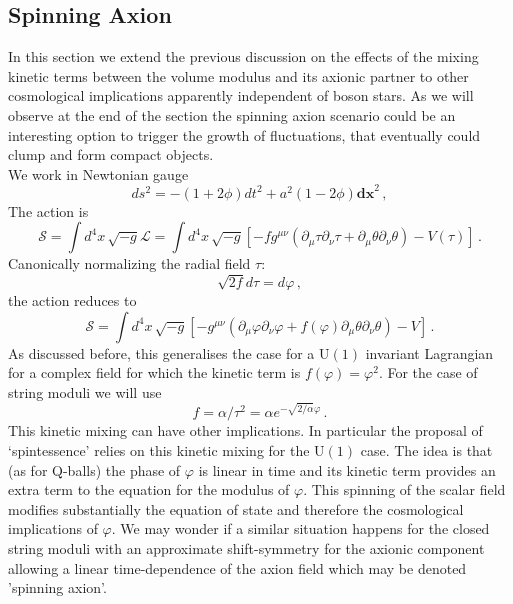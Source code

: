\documentclass[11pt,a4paper]{article}
\begin{document}
\subsection{Spinning Axion}
\label{sec:SpinningAxion}

In this section we extend the previous discussion on the effects of the mixing kinetic terms between the volume modulus and its axionic partner to other cosmological implications apparently independent of boson stars. As we will observe at the end of the section the spinning axion scenario could be an interesting option to trigger the growth of fluctuations, that eventually could clump and form compact objects.\\

We work in Newtonian gauge
\begin{equation}
ds^2 = - \left(1+2 \phi\right)  dt^2 + a^2 \left(1-2\phi\right) \mathbf{dx}^2 \,,
\end{equation}
The action is
\begin{equation}
\label{eq:ActionSpintessence}
\mathcal{S} = \int d^4x \, \sqrt{-g} \mathcal{L} = \int d^4x \, \sqrt{-g} \left[-f g^{\mu \nu} \left(\partial_\mu \tau \partial_\nu \tau + \partial_\mu \theta \partial_\nu \theta\right) - V(\tau)\right] \,.
\end{equation}
Canonically normalizing the radial field $\tau$:
\begin{equation}
\sqrt{2 f} d \tau = d \varphi \,,
\end{equation}
the action reduces to
\begin{equation}
\mathcal{S} = \int d^4x \, \sqrt{-g} \left[-g^{\mu \nu} \left(\partial_\mu \varphi \partial_\nu \varphi + f(\varphi) \partial_\mu \theta \partial_\nu \theta\right) - V\right] \,.
\end{equation}
As discussed before, this generalises the case for a U$(1)$ invariant Lagrangian for a complex field for which the kinetic term is $f(\varphi)=\varphi^2$. For the case of string moduli we will use
\begin{equation}
\label{eq:FModuli}
f=\alpha/\tau^2=\alpha e^{-\sqrt{2/\alpha}\varphi} \,.
\end{equation}
This kinetic mixing can have other implications. In particular the proposal of `spintessence' \cite{Boyle:2001du} relies on this kinetic mixing for the U$(1)$ case. The idea is that (as for Q-balls)  the phase of $\varphi$ is linear in time and its  kinetic term  provides an extra term to the equation for the modulus of $\varphi$. This spinning of the scalar field modifies substantially the equation of state and therefore the cosmological implications of $\varphi$. We may wonder if a similar situation happens for the closed string moduli with an approximate shift-symmetry for the axionic component allowing a linear time-dependence of the axion field which may be denoted 'spinning axion'.
\end{document}
